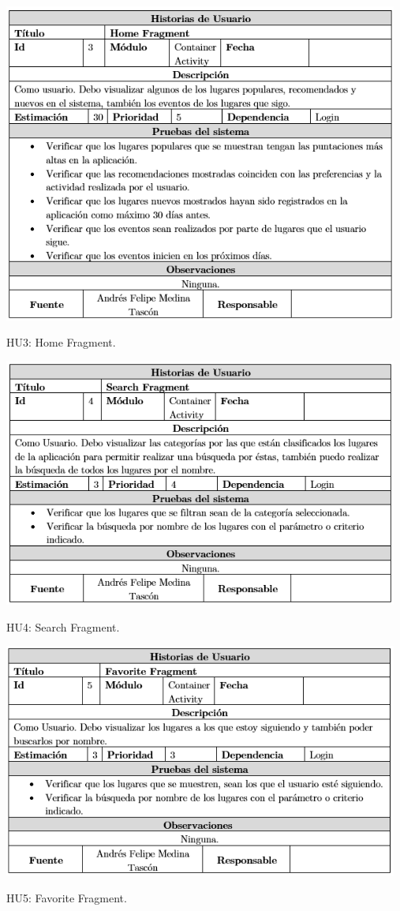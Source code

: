 \documentclass[12pt,letterpaper,openany]{book}
\begin{document}
\begin{table}[H]
\centering
\includegraphics[width=13cm]{./imagenes/HU/HU3}
\caption{HU3: Home Fragment.}
\end{table}

\begin{table}[H]
\centering
\includegraphics[width=13cm]{./imagenes/HU/HU4}
\caption{HU4: Search Fragment.}
\end{table}

\begin{table}[H]
\centering
\includegraphics[width=13cm]{./imagenes/HU/HU5}
\caption{HU5: Favorite Fragment.}
\end{table}
\end{document}
